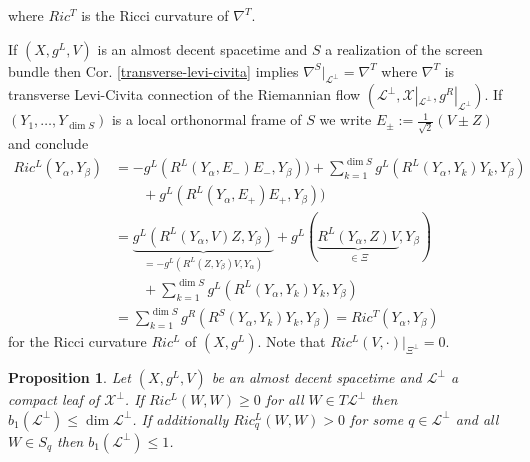\documentclass[a4paper,10pt,twoside]{amsart}
\newtheorem{proposition}[theorem]{Proposition}
\theoremstyle{definition}
\theoremstyle{remark}
\numberwithin{equation}{section}
\begin{document}
where $Ric^{T}$ is the Ricci curvature of $\nabla^{T}$.\par
If $(X,g^{L},V)$ is an almost decent spacetime and $S$ a realization of the screen bundle then Cor. \ref{transverse-levi-civita} implies
$\nabla^{S}|_{\mathcal{L}^{\perp}}=\nabla^{T}$ where $\nabla^{T}$ is transverse Levi-Civita connection of the Riemannian flow
$(\mathcal{L}^{\perp},\mathcal{X}|_{\mathcal{L}^{\perp}},g^{R}|_{\mathcal{L}^{\perp}})$. If $(Y_{1},\ldots,Y_{\dim S})$ is a local orthonormal frame
of $S$ we write $E_{\pm}:=\frac{1}{\sqrt{2}}(V \pm Z)$ and conclude
\begin{align*}
	Ric^{L}(Y_{\alpha},Y_{\beta}) &= -g^{L}(R^{L}(Y_{\alpha},E_{-})E_{-},Y_{\beta}))
						+\sum_{k=1}^{\dim S}{g^{L}(R^{L}(Y_{\alpha},Y_{k})Y_{k},Y_{\beta})}\\
					&\qquad +g^{L}(R^{L}(Y_{\alpha},E_{+})E_{+},Y_{\beta}))\\
			&= \underbrace{g^{L}(R^{L}(Y_{\alpha},V)Z,Y_{\beta})}_{=-g^{L}(R^{L}(Z,Y_{\beta})V,Y_{\alpha})}
					+ g^{L}(\underbrace{R^{L}(Y_{\alpha},Z)V}_{\in \Xi},Y_{\beta})\\
					&\qquad + \sum_{k=1}^{\dim S}{g^{L}(R^{L}(Y_{\alpha},Y_{k})Y_{k},Y_{\beta})}\\
			&= \sum_{k=1}^{\dim S}{g^{R}(R^{S}(Y_{\alpha},Y_{k})Y_{k},Y_{\beta})} = Ric^{T}(Y_{\alpha},Y_{\beta})
\end{align*}
for the Ricci curvature $Ric^{L}$ of $(X,g^{L})$. Note that $Ric^{L}(V,\cdot)|_{\Xi^{\perp}}=0$.
\begin{proposition}\label{cohom-of-a-leaf}
	Let $(X,g^{L},V)$ be an almost decent spacetime and $\mathcal{L}^{\perp}$ a compact leaf of $\mathcal{X}^{\perp}$.
	If $Ric^{L}(W,W) \geq 0$ for all $W \in T\mathcal{L}^{\perp}$ then $b_{1}(\mathcal{L}^{\perp}) \leq \dim\mathcal{L}^{\perp}$.
	If additionally $Ric^{L}_{q}(W,W) > 0$ for some $q \in \mathcal{L}^{\perp}$ and all $W \in S_{q}$ then
	$b_{1}(\mathcal{L}^{\perp}) \leq 1$.
\end{proposition}
\end{document}
